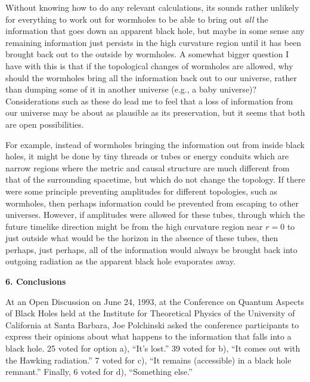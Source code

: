 	Without knowing how to do any relevant calculations, its
sounds rather
unlikely for everything to work out for wormholes to be able to bring
out {\it
all} the information that goes down an apparent black hole, but maybe
in some
sense any remaining information just persists in the high curvature
region
until it has been brought back out to the outside by wormholes.  A
somewhat
bigger question I have with this is that if the topological changes
of
wormholes
are allowed, why should the wormholes bring all the information back
out to our
universe, rather than dumping some of it in another universe (e.g., a
baby
universe)?  Considerations such as these do lead me to feel that a
loss of
information from our universe may be about as plausible as its
preservation,
but it seems that both are open possibilities.

	For example, instead of wormholes bringing the information
out from
inside black holes, it might be done by tiny threads or tubes or
energy
conduits
which are narrow regions
where the metric and causal structure are much different from that of
the
surrounding spacetime, but which do not change the topology.  If
there were
some principle preventing amplitudes for different topologies, such
as
wormholes, then perhaps information could be prevented from escaping
to other
universes.  However, if amplitudes were allowed for these tubes,
through which
the future timelike direction might be from the high curvature region
near
$r=0$ to just outside what would be the horizon in the absence of
these tubes,
then perhaps, just perhaps, all of the information would always be
brought back
into outgoing radiation as the apparent black hole evaporates away.

\vspace{5 mm}
{\bf 6.  Conclusions}
\vspace{5 mm}

	At an Open Discussion on June 24, 1993, at the Conference on
Quantum
Aspects of Black Holes held at the Institute for Theoretical Physics
of the
University
of California at Santa Barbara, Joe Polchinski asked the conference
participants
to express their opinions about what happens to the information that
falls into
a black hole.  25 voted for option a), ``It's lost.''  39 voted for
b), ``It
comes
out with the Hawking radiation.''  7 voted for c), ``It remains
(accessible) in
a
black hole remnant.''  Finally, 6 voted for d), ``Something else.''

